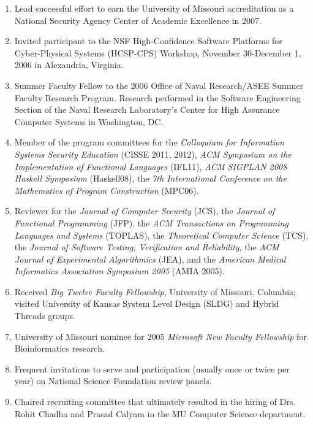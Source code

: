\documentclass[12pt]{article} %
\begin{document}
\begin{enumerate}[leftmargin=0mm]
\item Lead successful effort to earn the University of Missouri accreditation as a National Security Agency Center of Academic Excellence in 2007. 

\item Invited participant to the NSF High-Confidence Software
  Platforms for Cyber-Physical Systems (HCSP-CPS) Workshop, November
  30-December 1, 2006 in Alexandria, Virginia.


\item Summer Faculty Fellow to the 2006 Office of Naval Research/ASEE
  Summer Faculty Research Program. Research performed in the Software
  Engineering Section of the Naval Research Laboratory's Center for
  High Assurance Computer Systems in Washington, DC. 

\item  Member of the program committees for the {\em Colloquium for Information Systems Security Education} (CISSE 2011, 2012), {\em ACM Symposium on the Implementation of Functional Languages} (IFL11), {\em ACM SIGPLAN 2008
    Haskell Symposium} (Haskell08), the {\em 7th International
Conference on the Mathematics of Program Construction} (MPC06).

\item Reviewer for the {\em Journal of Computer Security} (JCS), the {\em Journal of Functional Programming} (JFP),
the {\em ACM Transactions on Programming Languages and Systems} (TOPLAS),
the {\em Theoretical Computer Science} (TCS),
the {\em Journal of Software Testing, Verification and Reliability},
the {\em ACM Journal of Experimental Algorithmics} (JEA), and the {\em American
Medical Informatics Association Symposium 2005} (AMIA 2005). 


\item Received \emph{Big Twelve Faculty Fellowship}, University of
  Missouri, Columbia; visited University of Kansas System Level Design (SLDG)
  and Hybrid Threads groups.




\item University of Missouri nominee for 2005 {\em Microsoft New Faculty Fellowship} for Bioinformatics research.

\item Frequent invitations to serve and participation (usually once or twice per year)  on National Science Foundation review panels.


\item Chaired recruiting committee that ultimately resulted in the hiring of Drs. Rohit Chadha and Prasad Calyam in the MU Computer Science department. 


\end{enumerate}
\end{document}
